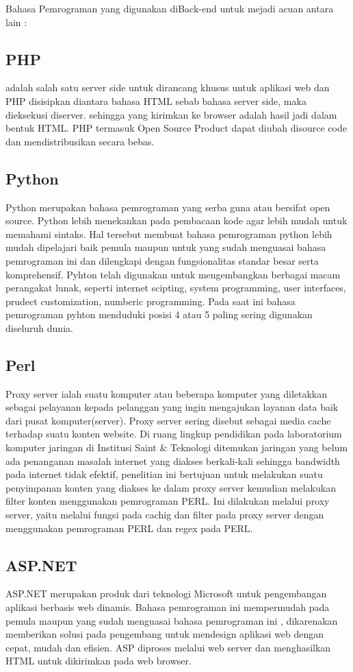 Bahasa Pemrograman yang digunakan diBack-end untuk mejadi acuan antara lain :
\subsection {PHP}
 	adalah salah satu server side untuk dirancang khusus untuk aplikasi web dan PHP disisipkan diantara bahasa HTML sebab bahasa server side, maka dieksekusi diserver. sehingga yang kirimkan ke browser adalah hasil jadi dalam bentuk HTML. PHP termasuk Open Source Product dapat diubah disource code dan mendistribusikan secara bebas.

\subsection{Python}
Python merupakan  bahasa pemrograman yang serba guna atau bersifat open source. Python lebih menekankan pada pembacaan  kode agar lebih mudah untuk memahami sintaks. Hal tersebut membuat bahasa pemrograman python lebih mudah dipelajari baik pemula maupun untuk yang sudah menguasai bahasa pemrograman ini dan dilengkapi dengan fungsionalitas standar besar serta komprehensif. Pyhton telah digunakan untuk mengembangkan berbagai macam perangakat lunak, seperti internet scipting, system programming, user interfaces, prudect customization, numberic programming. Pada saat ini bahasa pemrograman pyhton menduduki posisi 4 atau 5 paling sering digunakan diseluruh dunia.

\subsection{Perl}
Proxy server ialah suatu komputer atau beberapa komputer yang diletakkan sebagai pelayanan kepada pelanggan yang ingin mengajukan layanan data baik dari pusat komputer(server).
Proxy server sering disebut sebagai media cache terhadap suatu konten website. Di ruang lingkup pendidikan pada laboratorium komputer jaringan di Institusi Saint & Teknologi ditemukan jaringan yang belum ada penanganan masalah internet yang diakses berkali-kali sehingga bandwidth pada internet tidak efektif, penelitian ini bertujuan  untuk melakukan suatu penyimpanan konten yang diakses ke dalam proxy server kemudian melakukan filter konten menggunakan pemrograman PERL.
Ini dilakukan melalui proxy server, yaitu melalui fungsi pada cachig dan filter pada proxy server dengan menggunakan pemrograman PERL dan regex pada PERL.

\subsection{ASP.NET}
ASP.NET merupakan produk dari teknologi Microsoft untuk pengembangan aplikasi berbasis web dinamis. 
Bahasa pemrograman ini mempermudah pada pemula maupun yang sudah menguasai bahasa pemrograman ini , dikarenakan memberikan solusi pada pengembang untuk mendesign aplikasi web dengan cepat, mudah dan efisien. 
ASP diproses melalui web server dan menghasilkan HTML untuk dikirimkan pada web browser.



